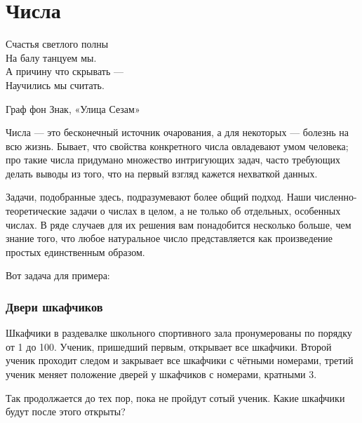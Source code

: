 \chapter*{Числа}

\epigraph{Счастья светлого полны\\ %
На балу танцуем мы.\\ %
А причину что скрывать ---\\ %
Научились мы считать.}{Граф фон Знак, «Улица Сезам»}


 

Числа --- это бесконечный источник очарования, а для некоторых --- болезнь на всю жизнь. %
Бывает, что свойства конкретного числа овладевают умом человека;
про такие числа придумано множество интригующих задач,
часто требующих делать выводы из того, что на первый взгляд кажется нехваткой данных.

Задачи, подобранные здесь, подразумевают %
более общий подход. %
Наши численно-теоретические задачи о числах в целом, а не только об отдельных, особенных числах. 
В ряде случаев для их решения вам понадобится несколько больше, чем знание того, 
что любое натуральное число представляется как произведение простых единственным образом.

\medskip

Вот задача для примера:

\subsection*{Двери шкафчиков}%

Шкафчики в раздевалке школьного спортивного зала пронумерованы по порядку от 1 до 100. Ученик, пришедший первым, открывает все шкафчики.
Второй ученик проходит следом и закрывает все шкафчики с чётными номерами, третий ученик меняет положение дверей у шкафчиков с номерами, кратными 3.

Так продолжается до тех пор, пока не пройдут сотый ученик. 
Какие шкафчики будут после этого открыты?
 
